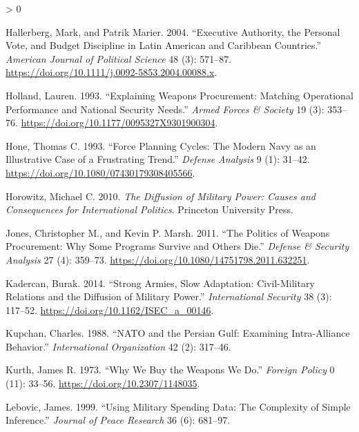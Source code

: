 \documentclass[
]{article}
\newlength{\cslhangindent}
\newenvironment{CSLReferences}[2] %
 {%
  \setlength{\parindent}{0pt}
  \ifodd #1 \everypar{\setlength{\hangindent}{\cslhangindent}}\ignorespaces\fi
  \ifnum #2 > 0
  \setlength{\parskip}{#2\baselineskip}
  \fi
 }%
 {}
\begin{document}
\begin{CSLReferences}{1}{0}
\leavevmode\hypertarget{ref-hallerberg_executiveauthoritypersonal_2004}{}%
Hallerberg, Mark, and Patrik Marier. 2004. {``Executive {Authority}, the {Personal Vote}, and {Budget Discipline} in {Latin American} and {Caribbean Countries}.''} \emph{American Journal of Political Science} 48 (3): 571--87. \url{https://doi.org/10.1111/j.0092-5853.2004.00088.x}.

\leavevmode\hypertarget{ref-holland_explainingweaponsprocurement_1993}{}%
Holland, Lauren. 1993. {``Explaining {Weapons Procurement}: {Matching Operational Performance} and {National Security Needs}.''} \emph{Armed Forces \& Society} 19 (3): 353--76. \url{https://doi.org/10.1177/0095327X9301900304}.

\leavevmode\hypertarget{ref-hone_forceplanningcycles_1993}{}%
Hone, Thomas C. 1993. {``Force Planning Cycles: {The} Modern Navy as an Illustrative Case of a Frustrating Trend.''} \emph{Defense Analysis} 9 (1): 31--42. \url{https://doi.org/10.1080/07430179308405566}.

\leavevmode\hypertarget{ref-horowitz_diffusionmilitarypower_2010}{}%
Horowitz, Michael C. 2010. \emph{The {Diffusion} of {Military Power}: {Causes} and {Consequences} for {International Politics}}. {Princeton University Press}.

\leavevmode\hypertarget{ref-jones_politicsweaponsprocurement_2011}{}%
Jones, Christopher M., and Kevin P. Marsh. 2011. {``The {Politics} of {Weapons Procurement}: {Why Some Programs Survive} and {Others Die}.''} \emph{Defense \& Security Analysis} 27 (4): 359--73. \url{https://doi.org/10.1080/14751798.2011.632251}.

\leavevmode\hypertarget{ref-kadercan_strongarmiesslow_2014}{}%
Kadercan, Burak. 2014. {``Strong {Armies}, {Slow Adaptation}: {Civil-Military Relations} and the {Diffusion} of {Military Power}.''} \emph{International Security} 38 (3): 117--52. \url{https://doi.org/10.1162/ISEC_a_00146}.

\leavevmode\hypertarget{ref-kupchan_natopersiangulf_1988}{}%
Kupchan, Charles. 1988. {``{NATO} and the {Persian Gulf}: {Examining Intra-Alliance Behavior}.''} \emph{International Organization} 42 (2): 317--46.

\leavevmode\hypertarget{ref-kurth_whywebuy_1973}{}%
Kurth, James R. 1973. {``Why {We Buy} the {Weapons We Do}.''} \emph{Foreign Policy} 0 (11): 33--56. \url{https://doi.org/10.2307/1148035}.

\leavevmode\hypertarget{ref-lebovic_usingmilitaryspending_1999}{}%
Lebovic, James. 1999. {``Using {Military Spending Data}: {The Complexity} of {Simple Inference}.''} \emph{Journal of Peace Research} 36 (6): 681--97.


\end{CSLReferences}
\end{document}
